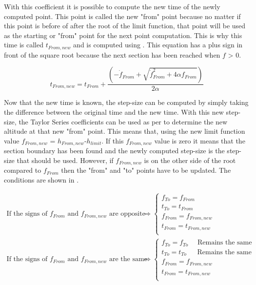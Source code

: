 \noindent
With this coefficient it is possible to compute the new time of the newly computed point. This point is called the new "from" point because no matter if this point is before of after the root of the limit function, that point will be used as the starting or "from" point for the next point computation. This is why this time is called $t_{From,new}$ and is computed using . This equation has a plus sign in front of the square root because the next section has been reached when $f$ > 0.

\begin{equation} \label{eq:tFromNew}
t_{From,new} = t_{From}+\dfrac{\left(-\dot{f}_{From}+\sqrt{\dot{f}_{From}^{2}+4\alpha f_{From}}\right)}{2\alpha}
\end{equation}

\noindent
Now that the new time is known, the step-size can be computed by simply taking the difference between the original time and the new time. With this new step-size, the Taylor Series coefficients can be used as per  to determine the new altitude at that new "from" point. This means that, using  the new limit function value $f_{From,new}$ = $h_{From,new}$-$h_{limit}$. If this $f_{From,new}$ value is zero it means that the section boundary has been found and the newly computed step-size is the step-size that should be used. However, if $f_{From,new}$ is on the other side of the root compared to $f_{From}$ then the "from" and "to" points have to be updated. The conditions are shown in .

\begin{equation}\label{eq:updatedPointsRoot}
\begin{split}
\text{If the signs of }f_{From}\text{ and }f_{From,new}\text{ are opposite}&\Rightarrow\begin{cases}
f_{To}=f_{From}\\
t_{To}=t_{From} \\
f_{From}=f_{From,new}\\
t_{From}=t_{From,new} \\ 
\end{cases}\\
\text{If the signs of }f_{From}\text{ and }f_{From,new}\text{ are the same}&\Rightarrow\begin{cases}
f_{To}=f_{To} \quad \text{  Remains the same}\\
t_{To}=t_{To} \quad \ \text{  Remains the same}\\
f_{From}=f_{From,new}\\
t_{From}=t_{From,new} \\ 
\end{cases}\\
\end{split}
\end{equation}

